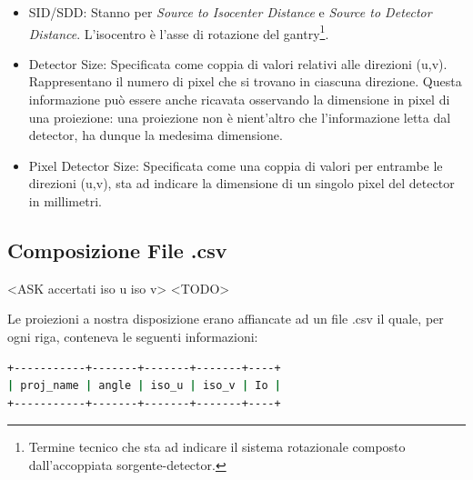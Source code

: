 \documentclass[a4paper,12pt, doubleside]{report}
\begin{document}
                    \begin{itemize}
                        \item SID/SDD: Stanno per \textit{Source to Isocenter Distance} e \textit{Source to Detector Distance}. L'isocentro è l'asse di rotazione del gantry\footnote{Termine tecnico che sta ad indicare il sistema rotazionale composto dall'accoppiata sorgente-detector.}.
                        \item Detector Size: Specificata come coppia di valori relativi alle direzioni (u,v). Rappresentano il numero di pixel che si trovano in ciascuna direzione. Questa informazione può essere anche ricavata osservando la dimensione in pixel di una proiezione: una proiezione non è nient'altro che l'informazione letta dal detector, ha dunque la medesima dimensione.
                        \item Pixel Detector Size: Specificata come una coppia di valori per entrambe le direzioni (u,v), sta ad indicare la dimensione di un singolo pixel del detector in millimetri.
                    \end{itemize}
                    
                    
            
            \subsection{Composizione File .csv}
                \label{sub:csv}
                <ASK accertati iso u iso v> <TODO>
                \par
                    Le proiezioni a nostra disposizione erano affiancate ad un file .csv il quale, per ogni riga, conteneva le seguenti informazioni:
                    \begin{lstlisting}[language=bash, frame=bt]
+-----------+-------+-------+-------+----+
| proj_name | angle | iso_u | iso_v | Io |
+-----------+-------+-------+-------+----+
                    \end{lstlisting}
                    
\end{document}
